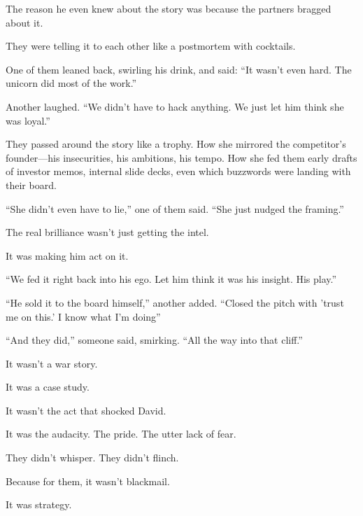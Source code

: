 \medskip

The reason he even knew about the story was because the partners bragged about it.

They were telling it to each other like a postmortem with cocktails.

One of them leaned back, swirling his drink, and said:
``It wasn’t even hard. The unicorn did most of the work.''

Another laughed.
``We didn’t have to hack anything. We just let him think she was loyal.''

They passed around the story like a trophy.
How she mirrored the competitor’s founder—his insecurities, his ambitions, his tempo.
How she fed them early drafts of investor memos, internal slide decks, even which 
buzzwords were landing with their board.

``She didn’t even have to lie,'' one of them said. ``She just nudged the framing.''

The real brilliance wasn’t just getting the intel.

It was making him act on it.

``We fed it right back into his ego. Let him think it was his insight. His play.''

``He sold it to the board himself,'' another added. ``Closed the pitch with 'trust me 
on this.' I know what I'm doing''

``And they did,'' someone said, smirking. ``All the way into that cliff.''

It wasn’t a war story.

It was a case study.

It wasn’t the act that shocked David.

It was the audacity.
The pride.
The utter lack of fear.

They didn’t whisper.
They didn’t flinch.

Because for them, it wasn’t blackmail.

It was strategy.

\medskip

